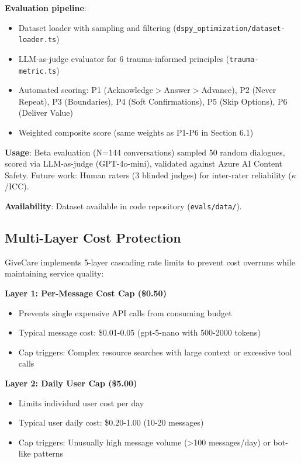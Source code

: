 \documentclass{article}
\begin{document}
\textbf{Evaluation pipeline}:
\begin{itemize}
    \item Dataset loader with sampling and filtering (\texttt{dspy\_optimization/dataset-loader.ts})
    \item LLM-as-judge evaluator for 6 trauma-informed principles (\texttt{trauma-metric.ts})
    \item Automated scoring: P1 (Acknowledge$>$Answer$>$Advance), P2 (Never Repeat), P3 (Boundaries), P4 (Soft Confirmations), P5 (Skip Options), P6 (Deliver Value)
    \item Weighted composite score (same weights as P1-P6 in Section 6.1)
\end{itemize}

\textbf{Usage}: Beta evaluation (N=144 conversations) sampled 50 random dialogues, scored via LLM-as-judge (GPT-4o-mini), validated against Azure AI Content Safety. Future work: Human raters (3 blinded judges) for inter-rater reliability ($\kappa$/ICC).

\textbf{Availability}: Dataset available in code repository (\texttt{evals/data/}).

%
\subsection{Multi-Layer Cost Protection}%
\label{subsec:MultiLayerCostProtection}%

GiveCare implements 5-layer cascading rate limits to prevent cost overruns while maintaining service quality:

\textbf{Layer 1: Per-Message Cost Cap (\$0.50)}
\begin{itemize}
    \item Prevents single expensive API calls from consuming budget
    \item Typical message cost: \$0.01-0.05 (gpt-5-nano with 500-2000 tokens)
    \item Cap triggers: Complex resource searches with large context or excessive tool calls
\end{itemize}

\textbf{Layer 2: Daily User Cap (\$5.00)}
\begin{itemize}
    \item Limits individual user cost per day
    \item Typical user daily cost: \$0.20-1.00 (10-20 messages)
    \item Cap triggers: Unusually high message volume (>100 messages/day) or bot-like patterns
\end{itemize}
\end{document}
